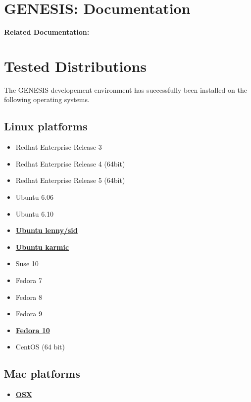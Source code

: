 \documentclass[12pt]{article}
\begin{document}
\section*{GENESIS: Documentation}

{\bf Related Documentation:}

\section*{Tested Distributions}

The GENESIS developement environment has successfully been installed on the following operating systems.

\subsection*{Linux platforms}

\begin{itemize}
\item Redhat Enterprise Release 3
\item Redhat Enterprise Release 4 (64bit)
\item Redhat Enterprise Release 5 (64bit)
\item Ubuntu 6.06
\item Ubuntu 6.10
\item \href{../installation-ubuntu-lennysid/installation-ubuntu-lennysid.tex}{\bf Ubuntu lenny/sid}
\item \href{../installation-ubuntu-karmic/installation-ubuntu-karmic.tex}{\bf Ubuntu karmic}
\item Suse 10
\item Fedora 7
\item Fedora 8
\item Fedora 9
\item \href{../installation-fedora10/installation-fedora10.tex}{\bf Fedora 10}
\item CentOS (64 bit)%
\end{itemize}

\subsection*{Mac platforms}

\begin{itemize}
\item \href{../installation-osx/installation-osx.tex}{\bf OSX}
\end{itemize}
\end{document}
